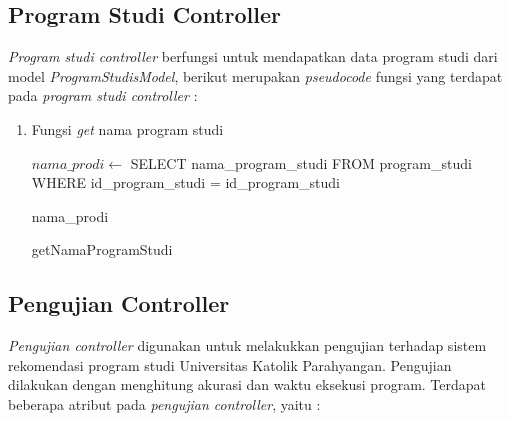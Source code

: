 \subsection{Program Studi Controller}
\label{subsec:prodicontroller}

\textit{Program studi controller} berfungsi untuk mendapatkan data program studi dari model \textit{ProgramStudisModel}, berikut merupakan \textit{pseudocode} fungsi yang terdapat pada \textit{program studi controller} :

\begin{enumerate}
    \item Fungsi \textit{get} nama program studi \\
        
        \begin{algorithm}[H]
            \begin{algorithmic}[1]
                    \State $nama\_prodi \gets$ SELECT nama\_program\_studi FROM program\_studi WHERE id\_program\_studi = id\_program\_studi
                    
                    \State \Return nama\_prodi
                \EndProcedure
            \end{algorithmic} 
            \caption{getNamaProgramStudi}
            \label{alg:getNamaProgramStudi}
        \end{algorithm}
        
\end{enumerate}



\subsection{Pengujian Controller}
\label{subsec:pengujian controller}

\textit{Pengujian controller} digunakan untuk melakukkan pengujian terhadap sistem rekomendasi program studi Universitas Katolik Parahyangan. Pengujian dilakukan dengan menghitung akurasi dan waktu eksekusi program. Terdapat beberapa atribut pada \textit{pengujian controller}, yaitu :

